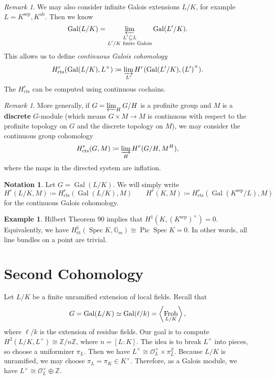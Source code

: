 \documentclass[leqno, openany]{memoir}
\theoremstyle{definition}
\newtheorem{exm}[thm]{Example}
\newtheorem{notn}[thm]{Notation}
\theoremstyle{remark}
\newtheorem{rmk}[thm]{Remark}
\theoremstyle{plain}
\theoremstyle{definition}
\theoremstyle{remark}
\newcommand{\Z}{\mathbb{Z}}
\newcommand{\mc}[1]{\mathcal{#1}}
\newcommand{\mr}[1]{\mathrm{#1}}
\DeclareMathOperator{\Gal}{Gal}
\DeclareMathOperator{\Spec}{Spec}
\DeclareMathOperator{\Pic}{Pic}
\DeclareMathOperator{\Frob}{Frob}
\begin{document}
\begin{rmk}
    We may also consider infinite Galois extensions $L/K$, for example $L = K^{\mr{sep}}, K^{\mr{ab}}$. Then we know
    \[ \Gal(L/K) = \varprojlim_{\substack{L' \subseteq L \\ \text{$L'/K$ finite Galois}}} \Gal(L'/K). \]
    This allows us to define \textit{continuous Galois cohomology}
    \[ H^r_{\mr{cts}}(\Gal(L/K), L^{\times}) \coloneqq \varinjlim_{L'} H^r(\Gal(L'/K), {(L')}^{\times}). \]
    The $H^r_{\mr{cts}}$ can be computed using continuous cochains.
\end{rmk}

\begin{rmk}
    More generally, if $G = \varprojlim_{H} G/H$ is a profinite group and $M$ is a \textbf{discrete} $G$-module (which means $G \times M \to M$ is continuous with respect to the profinite topology on $G$ and the discrete topology on $M$), we may consider the continuous group cohomology
    \[ H^r_{\mr{cts}}(G, M) \coloneqq \varinjlim_H H^r(G/H, M^H), \]
    where the maps in the directed system are inflation.
\end{rmk}

\begin{notn}
    Let $G = \Gal(L/K)$. We will simply write 
    \[ H^r(L/K, M) \coloneqq H^r_{\mr{cts}}(\Gal(L/K), M) \qquad H^r(K, M) \coloneqq H^r_{\mr{cts}}(\Gal(K^{\mr{sep}}/L), M) \]
    for the continuous Galois cohomology.
\end{notn}

\begin{exm}
    Hilbert Theorem 90 implies that $H^1(K, {(K^{\mr{sep}})}^{\times}) = 0$. Equivalently, we have $H^1_{\text{\'et}}(\Spec K, \mathbb{G}_m) \cong \Pic \Spec K = 0$. In other words, all line bundles on a point are trivial.
\end{exm}

\section{Second Cohomology}%
\label{sec:second_cohomology}

Let $L/K$ be a finite unramified extension of local fields. Recall that 
\[ G = \Gal(L/K) \simeq \Gal(\ell / k) = \ev{\Frob_{L/K}}, \] 
where $\ell/k$ is the extension of residue fields. Our goal is to compute $H^2(L/K, L^{\times}) \cong \Z/n\Z$, where $n = [L:K]$. The idea is to break $L^{\times}$ into pieces, so choose a uniformizer $\pi_L$. Then we have $L^{\times} \cong \mc{O}_L^{\times} \times \pi_L^{\Z}$. Because $L/K$ is unramified, we may choose $\pi_L = \pi_K \in K^{\times}$. Therefore, as a Galois module, we have $L^{\times} \cong \mc{O}_L^{\times} \oplus \Z$.
\end{document}
